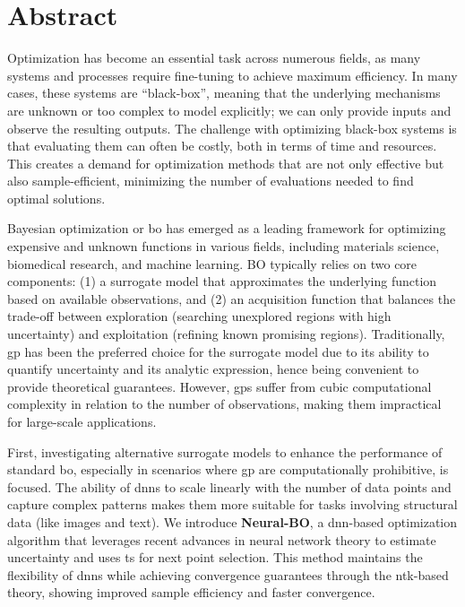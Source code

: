 \chapter*{Abstract} %
\label{chap:abstract}
Optimization has become an essential task across numerous fields, as many systems and processes require fine-tuning to achieve maximum efficiency. In many cases, these systems are ``black-box'', meaning that the underlying mechanisms are unknown or too complex to model explicitly; we can only provide inputs and observe the resulting outputs. The challenge with optimizing black-box systems is that evaluating them can often be costly, both in terms of time and resources. This creates a demand for optimization methods that are not only effective but also sample-efficient, minimizing the number of evaluations needed to find optimal solutions. 


Bayesian optimization or \ac{bo} has emerged as a leading framework for optimizing expensive and unknown functions in various fields, including materials science, biomedical research, and machine learning. BO typically relies on two core components: (1) a surrogate model that approximates the underlying function based on available observations, and (2) an acquisition function that balances the trade-off between exploration (searching unexplored regions with high uncertainty) and exploitation (refining known promising regions). Traditionally, \ac{gp} has been the preferred choice for the surrogate model due to its ability to quantify uncertainty and its analytic expression, hence being convenient to provide theoretical guarantees. However, \acp{gp} suffer from cubic computational complexity in relation to the number of observations, making them impractical for large-scale applications.


First, investigating alternative surrogate models to enhance the performance of standard \ac{bo}, especially in scenarios where \ac{gp} are computationally prohibitive, is focused. 
The ability of \acp{dnn} to scale linearly with the number of data points and capture complex patterns makes them more suitable for tasks involving structural data (like images and text). We introduce \textbf{Neural-BO}, a \ac{dnn}-based optimization algorithm that leverages recent advances in neural network theory to estimate uncertainty and uses \ac{ts} for next point selection. This method maintains the flexibility of \acp{dnn} while achieving convergence guarantees through the \ac{ntk}-based theory, showing improved sample efficiency and faster convergence.   

